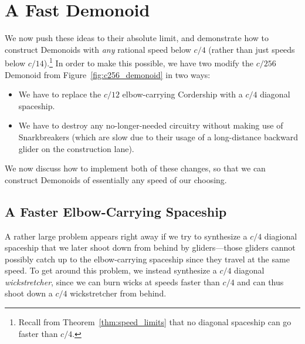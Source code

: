 \section{A Fast Demonoid}\label{sec:fast_demonoid}

We now push these ideas to their absolute limit, and demonstrate how to construct Demonoids with \emph{any} rational speed below $c/4$ (rather than just speeds below $c/14$).\footnote{Recall from Theorem~\ref{thm:speed_limits} that no diagonal spaceship can go faster than $c/4$.} In order to make this possible, we have two modify the $c/256$ Demonoid from Figure~\ref{fig:c256_demonoid} in two ways:\smallskip

\begin{itemize}
	\item We have to replace the $c/12$ elbow-carrying Cordership with a $c/4$ diagonal spaceship.\smallskip
	
	\item We have to destroy any no-longer-needed circuitry without making use of Snarkbreakers (which are slow due to their usage of a long-distance backward glider on the construction lane).\smallskip
\end{itemize}

We now discuss how to implement both of these changes, so that we can construct Demonoids of essentially any speed of our choosing.


\subsection{A Faster Elbow-Carrying Spaceship}\label{sec:fast_demonoid_elbow_carry}

A rather large problem appears right away if we try to synthesize a $c/4$ diagional spaceship that we later shoot down from behind by gliders---those gliders cannot possibly catch up to the elbow-carrying spaceship since they travel at the same speed. To get around this problem, we instead synthesize a $c/4$ diagonal \emph{wickstretcher}, since we can burn wicks at speeds faster than $c/4$ and can thus shoot down a $c/4$ wickstretcher from behind.


